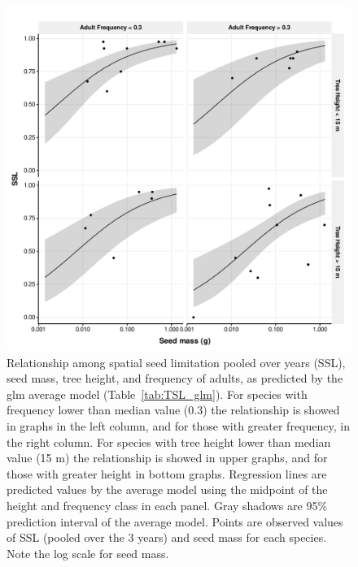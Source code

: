 \documentclass{article}
\begin{document}
\begin{figure}
  \centering
  \includegraphics[width=\textwidth]{../figures/SSL_all_pred_prob_glm}
  \caption{Relationship among spatial seed limitation pooled over
    years (SSL), seed mass, tree height, and frequency of adults, as
    predicted by the glm average model (Table~\ref{tab:TSL_glm}). For species with
    frequency lower than median value (0.3) the relationship is showed
    in graphs in the left column, and for those with greater
    frequency, in the right column. For species with tree height lower
    than median value (15 m) the relationship is showed in upper
    graphs, and for those with greater height in bottom
    graphs. Regression lines are predicted values by the average model
    using the midpoint of the height and frequency class in each
    panel. Gray shadows are 95\% prediction interval of the average
    model. Points are observed values of SSL (pooled over the 3 years)
    and seed mass for each species. Note the log scale for seed mass.}
  \label{fig:SSL_glm}
\end{figure}
\end{document}
